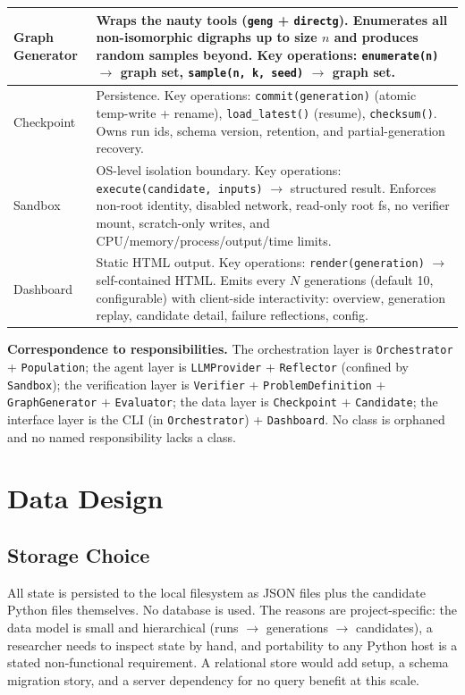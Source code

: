 \documentclass[12pt,a4paper]{article}
\begin{document}
\begin{longtable}{|p{3cm}|p{10cm}|}
\hline
Graph Generator & Wraps the nauty tools (\texttt{geng} + \texttt{directg}). Enumerates all non-isomorphic digraphs up to size $n$ and produces random samples beyond. Key operations: \texttt{enumerate(n)} $\to$ graph set, \texttt{sample(n, k, seed)} $\to$ graph set. \\
\hline
Checkpoint & Persistence. Key operations: \texttt{commit(generation)} (atomic temp-write + rename), \texttt{load\_latest()} (resume), \texttt{checksum()}. Owns run ids, schema version, retention, and partial-generation recovery. \\
\hline
Sandbox & OS-level isolation boundary. Key operations: \texttt{execute(candidate, inputs)} $\to$ structured result. Enforces non-root identity, disabled network, read-only root fs, no verifier mount, scratch-only writes, and CPU/memory/process/output/time limits. \\
\hline
Dashboard & Static HTML output. Key operations: \texttt{render(generation)} $\to$ self-contained HTML. Emits every $N$ generations (default 10, configurable) with client-side interactivity: overview, generation replay, candidate detail, failure reflections, config. \\
\hline
\end{longtable}

\textbf{Correspondence to responsibilities.} The orchestration layer is \texttt{Orchestrator} + \texttt{Population}; the agent layer is \texttt{LLMProvider} + \texttt{Reflector} (confined by \texttt{Sandbox}); the verification layer is \texttt{Verifier} + \texttt{ProblemDefinition} + \texttt{GraphGenerator} + \texttt{Evaluator}; the data layer is \texttt{Checkpoint} + \texttt{Candidate}; the interface layer is the CLI (in \texttt{Orchestrator}) + \texttt{Dashboard}. No class is orphaned and no named responsibility lacks a class.

\section{Data Design}
\label{sec:data}

\subsection{Storage Choice}

All state is persisted to the local filesystem as JSON files plus the candidate Python files themselves. No database is used. The reasons are project-specific: the data model is small and hierarchical (runs $\to$ generations $\to$ candidates), a researcher needs to inspect state by hand, and portability to any Python host is a stated non-functional requirement. A relational store would add setup, a schema migration story, and a server dependency for no query benefit at this scale.
\end{document}
